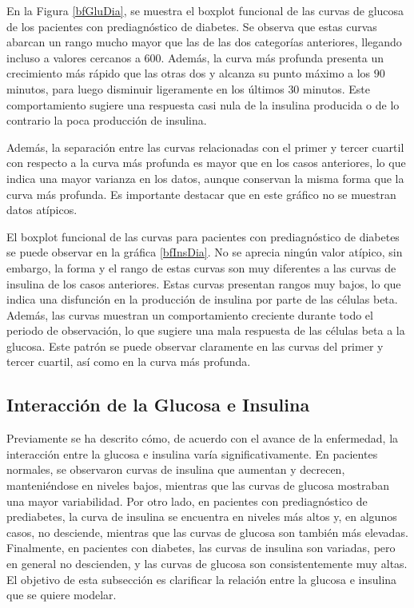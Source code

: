En la Figura \ref{bfGluDia}, se muestra el boxplot funcional de las curvas de glucosa de los pacientes con prediagnóstico de diabetes. Se observa que estas curvas abarcan un rango mucho mayor que las de las dos categorías anteriores, llegando incluso a valores cercanos a $600$. Además, la curva más profunda presenta un crecimiento más rápido que las otras dos y alcanza su punto máximo a los $90$ minutos, para luego disminuir ligeramente en los últimos $30$ minutos. Este comportamiento sugiere una respuesta casi nula de la insulina producida o de lo contrario la poca producción de insulina. 

Además, la separación entre las curvas relacionadas con el primer y tercer cuartil con respecto a la curva más profunda es mayor que en los casos anteriores, lo que indica una mayor varianza en los datos, aunque conservan la misma forma que la curva más profunda. Es importante destacar que en este gráfico no se muestran datos atípicos.

El boxplot funcional de las curvas para pacientes con prediagnóstico de diabetes se puede observar en la gráfica \ref{bfInsDia}. No se aprecia ningún valor atípico, sin embargo, la forma y el rango de estas curvas son muy diferentes a las curvas de insulina de los casos anteriores. Estas curvas presentan rangos muy bajos, lo que indica una disfunción en la producción de insulina por parte de las células beta. Además, las curvas muestran un comportamiento creciente durante todo el periodo de observación, lo que sugiere una mala respuesta de las células beta a la glucosa.  Este patrón se puede observar claramente en las curvas del primer y tercer cuartil, así como en la curva más profunda.


\subsection{Interacción de la Glucosa e Insulina}

Previamente se ha descrito cómo, de acuerdo con el avance de la enfermedad, la interacción entre la glucosa e insulina varía significativamente. En pacientes normales, se observaron curvas de insulina que aumentan y decrecen, manteniéndose en niveles bajos, mientras que las curvas de glucosa mostraban una mayor variabilidad. Por otro lado, en pacientes con prediagnóstico de prediabetes, la curva de insulina se encuentra en niveles más altos y, en algunos casos, no desciende, mientras que las curvas de glucosa son también más elevadas. Finalmente, en pacientes con diabetes, las curvas de insulina son variadas, pero en general no descienden, y las curvas de glucosa son consistentemente muy altas. El objetivo de esta subsección es clarificar la relación entre la glucosa e insulina que se quiere modelar.

